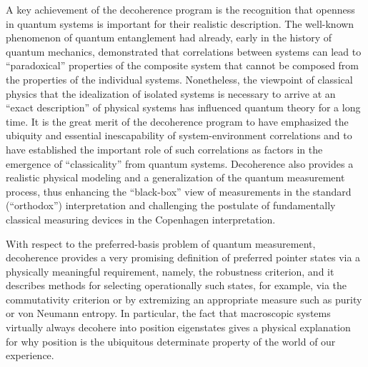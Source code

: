 \documentclass[twocolumn,rmp,aps,amsmath,amsfonts,noshowkeys,noshowpacs]{revtex4}
\begin{document}
A key achievement of the decoherence program is the recognition that
openness in quantum systems is important for their realistic
description. The well-known phenomenon of quantum entanglement had
already, early in the history of quantum mechanics, demonstrated that
correlations between systems can lead to ``paradoxical'' properties of
the composite system that cannot be composed from the properties of
the individual systems.  Nonetheless, the viewpoint of classical
physics that the idealization of isolated systems is necessary to
arrive at an ``exact description'' of physical systems has influenced
quantum theory for a long time.  It is the great merit of the
decoherence program to have emphasized the ubiquity and essential
inescapability of system-environment correlations and to have
established the important role of such correlations as factors in the
emergence of ``classicality'' from quantum systems. Decoherence also
provides a realistic physical modeling and a generalization of the
quantum measurement process, thus enhancing the ``black-box'' view of
measurements in the standard (``orthodox'') interpretation and
challenging the postulate of fundamentally classical measuring devices
in the Copenhagen interpretation.

With respect to the preferred-basis problem of quantum measurement,
decoherence provides a very promising definition of preferred pointer
states via a physically meaningful requirement, namely, the robustness
criterion, and it describes methods for selecting operationally such
states, for example, via the commutativity criterion or by extremizing
an appropriate measure such as purity or von Neumann entropy.  In
particular, the fact that macroscopic systems virtually always
decohere into position eigenstates gives a physical explanation for
why position is the ubiquitous determinate property of the world of
our experience.
\end{document}
